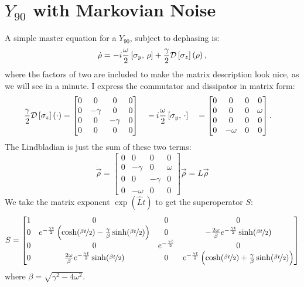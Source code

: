 \documentclass[10pt,a4paper, english]{scrartcl}
\begin{document}
\section{$Y_{90}$ with Markovian Noise}
A simple master equation for a $Y_{90}$, subject to dephasing is:
\begin{equation}
\dot{\rho} = -i\frac{\omega}{2} \left[\sigma_y,\,\rho \right] + \frac{\gamma}{2} \mathcal{D}\left[ \sigma_z \right]\left( \rho \right),
\end{equation}
where the factors of two are included to make the matrix description look nice, as we will see in a minute. 
I express the commutator and dissipator in matrix form:
\begin{alignat}{2}
\frac{\gamma}{2} \mathcal{D}\left[ \sigma_z \right]\left( \cdot \right) &= \begin{bmatrix}
0 & 0 & 0 & 0 \\ 0 & -\gamma & 0 & 0 \\ 0 & 0 & -\gamma & 0 \\ 0 & 0 & 0 & 0
\end{bmatrix}
\quad 
-i \frac{\omega}{2} \left[\sigma_y,\,\cdot \right] &&= \begin{bmatrix}
0 & 0 & 0 & 0 \\ 0 & 0 & 0 & \omega \\ 0 & 0 & 0 & 0 \\ 0 & -\omega & 0 & 0
\end{bmatrix}.
\end{alignat}
The Lindbladian is just the sum of these two terms:
\begin{equation}
\dot{\vec{\rho}} = \begin{bmatrix}
0 & 0 & 0 & 0 \\ 0 & -\gamma & 0 & \omega \\ 0 & 0 & -\gamma & 0 \\ 0 & -\omega & 0 & 0
\end{bmatrix} \vec{\rho} = \hat{L} \vec{\rho}
\end{equation}
We take the matrix exponent $\exp(\hat{L} t)$ to get the superoperator $S$:
\begin{equation}
S = \begin{bmatrix}
1 & 0 & 0 & 0 \\
0 & e^{-\frac{\gamma t}{2}}\left( \cosh(\nicefrac{\beta t}{2}) - \frac{\gamma}{\beta} \sinh(\nicefrac{\beta t}{2})\right) & 0 & -\frac{2 \omega}{\beta} e^{-\frac{\gamma t}{2}}\sinh(\nicefrac{\beta t}{2}) \\
0 & 0 & e^{-\frac{\gamma t}{2}} & 0 \\
0 & \frac{2 \omega}{\beta} e^{-\frac{\gamma t}{2}}\sinh(\nicefrac{\beta t}{2}) & 0 & e^{-\frac{\gamma t}{2}}\left( \cosh(\nicefrac{\beta t}{2}) + \frac{\gamma}{\beta} \sinh(\nicefrac{\beta t}{2})\right)
\end{bmatrix}
\end{equation}
where $\beta = \sqrt{\gamma^2 - 4\omega^2}$.
\end{document}
